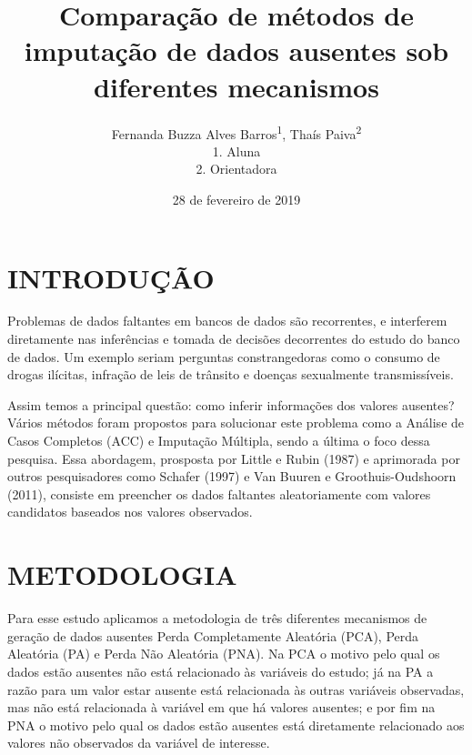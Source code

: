 \documentclass[]{article}
\title{Comparação de métodos de imputação de dados ausentes sob diferentes
mecanismos}
\author{Fernanda Buzza Alves Barros\textsuperscript{1}, Thaís
Paiva\textsuperscript{2}\\
1. Aluna\\
2. Orientadora}
\date{28 de fevereiro de 2019}
\begin{document}
\maketitle

\section{INTRODUÇÃO}\label{introducao}

Problemas de dados faltantes em bancos de dados são recorrentes, e
interferem diretamente nas inferências e tomada de decisões decorrentes
do estudo do banco de dados. Um exemplo seriam perguntas constrangedoras
como o consumo de drogas ilícitas, infração de leis de trânsito e
doenças sexualmente transmissíveis.

Assim temos a principal questão: como inferir informações dos valores
ausentes? Vários métodos foram propostos para solucionar este problema
como a Análise de Casos Completos (ACC) e Imputação Múltipla, sendo a
última o foco dessa pesquisa. Essa abordagem, prosposta por Little e
Rubin (1987) e aprimorada por outros pesquisadores como Schafer (1997) e
Van Buuren e Groothuis-Oudshoorn (2011), consiste em preencher os dados
faltantes aleatoriamente com valores candidatos baseados nos valores
observados.

\section{METODOLOGIA}\label{metodologia}

Para esse estudo aplicamos a metodologia de três diferentes mecanismos
de geração de dados ausentes Perda Completamente Aleatória (PCA), Perda
Aleatória (PA) e Perda Não Aleatória (PNA). Na PCA o motivo pelo qual os
dados estão ausentes não está relacionado às variáveis do estudo; já na
PA a razão para um valor estar ausente está relacionada às outras
variáveis observadas, mas não está relacionada à variável em que há
valores ausentes; e por fim na PNA o motivo pelo qual os dados estão
ausentes está diretamente relacionado aos valores não observados da
variável de interesse.
\end{document}
